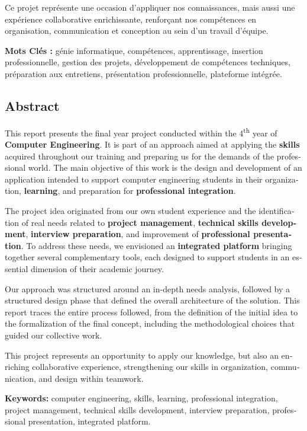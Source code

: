 \documentclass[12pt,a4paper]{report}
\newcommand{\headingfont}{}
\begin{document}
	Ce projet représente une occasion d'appliquer nos connaissances, mais aussi une expérience collaborative enrichissante, renforçant nos compétences en organisation, communication et conception au sein d'un travail d'équipe.
	
	\vspace{1cm}
	\noindent\textbf{Mots Clés :} génie informatique, compétences, apprentissage, insertion professionnelle, gestion des projets, développement de compétences techniques, préparation aux entretiens, présentation professionnelle, plateforme intégrée.
	
	\newpage
	\begin{english}
		\chapter*{{\headingfont Abstract}}
		
		This report presents the final year project conducted within the 4\textsuperscript{th} year of \textbf{Computer Engineering}. It is part of an approach aimed at applying the \textbf{skills} acquired throughout our training and preparing us for the demands of the professional world. The main objective of this work is the design and development of an application intended to support computer engineering students in their organization, \textbf{learning}, and preparation for \textbf{professional integration}.
		
		The project idea originated from our own student experience and the identification of real needs related to \textbf{project management}, \textbf{technical skills development}, \textbf{interview preparation}, and improvement of \textbf{professional presentation}. To address these needs, we envisioned an \textbf{integrated platform} bringing together several complementary tools, each designed to support students in an essential dimension of their academic journey.
		
		Our approach was structured around an in-depth needs analysis, followed by a structured design phase that defined the overall architecture of the solution. This report traces the entire process followed, from the definition of the initial idea to the formalization of the final concept, including the methodological choices that guided our collective work.
		
		This project represents an opportunity to apply our knowledge, but also an enriching collaborative experience, strengthening our skills in organization, communication, and design within teamwork.
		
		\vspace{1cm}
		\noindent\textbf{Keywords:} computer engineering, skills, learning, professional integration, project management, technical skills development, interview preparation, professional presentation, integrated platform.
	\end{english}
	
\end{document}
